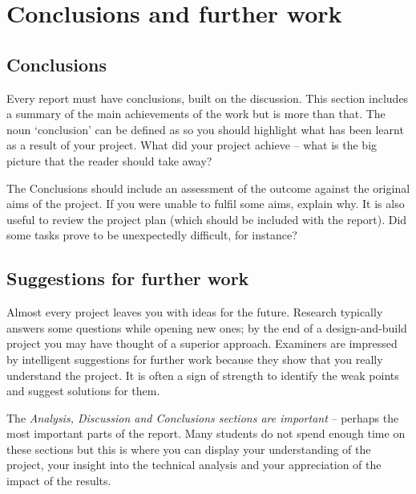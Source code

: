 \section{Conclusions and further work}

\subsection{Conclusions}

Every report must have conclusions, built on the discussion. This section
includes a summary of the main achievements of the work but is more than that.
The noun ‘conclusion’ can be defined as  \autocite{oxford} so you should highlight what has been
learnt as a result of your project. What did your project achieve – what is the
big picture that the reader should take away?

The Conclusions should include an assessment of the outcome against the original
aims of the project. If you were unable to fulfil some aims, explain why. It is
also useful to review the project plan (which should be included with the
report). Did some tasks prove to be unexpectedly difficult, for instance?

\subsection{Suggestions for further work}

Almost every project leaves you with ideas for the future. Research typically
answers some questions while opening new ones; by the end of a design-and-build
project you may have thought of a superior approach. Examiners are impressed by
intelligent suggestions for further work because they show that you really
understand the project. It is often a sign of strength to identify the weak
points and suggest solutions for them.

The \textit{Analysis, Discussion and Conclusions sections are important} –
perhaps the most important parts of the report. Many students do not spend
enough time on these sections but this is where you can display your
understanding of the project, your insight into the technical analysis and your
appreciation of the impact of the results.